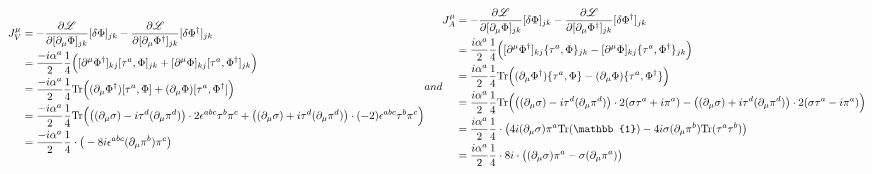 \begin{subequations}
    \begin{align}
        J^\mu_V & =-\frac{\partial\mathscr{L}}{\partial[\partial_\mu\Phi]_{jk}}[\delta\Phi]_{jk}-\frac{\partial\mathscr{L}}{\partial[\partial_\mu\Phi^\dagger]_{jk}}[\delta\Phi^\dagger]_{jk}                                                                      \\
                & =\frac{-\imagu\alpha^a}{2}\frac{1}{4}\Big([\partial^\mu\Phi^\dagger]_{kj}[\tau^a,\Phi]_{jk}+[\partial^\mu\Phi]_{kj}[\tau^a,\Phi^\dagger]_{jk}\Big)                                                                                               \\
                & =\frac{-\imagu\alpha^a}{2}\frac{1}{4}\Tr\Big((\partial_\mu\Phi^\dagger)[\tau^a,\Phi]+(\partial_\mu\Phi)[\tau^a,\Phi^\dagger]\Big)                                                                                                                \\
                & =\frac{-\imagu\alpha^a}{2}\frac{1}{4}\Tr\Big(\big((\partial_\mu\sigma)-\imagu\tau^d(\partial_\mu\pi^d)\big)\cdot2\epsilon^{abc}\tau^b\pi^c+\big((\partial_\mu\sigma)+\imagu\tau^d(\partial_\mu\pi^d)\big)\cdot(-2)\epsilon^{abc}\tau^b\pi^c\Big) \\
                & =\frac{-\imagu\alpha^a}{2}\frac{1}{4}\cdot\big(-8\imagu\epsilon^{abc}(\partial_\mu\pi^b)\pi^c\big)
    \end{align}
    and
    \begin{align}
        J^\mu_A & =-\frac{\partial\mathscr{L}}{\partial[\partial_\mu\Phi]_{jk}}[\delta\Phi]_{jk}-\frac{\partial\mathscr{L}}{\partial[\partial_\mu\Phi^\dagger]_{jk}}[\delta\Phi^\dagger]_{jk}                                                                    \\
                & =\frac{\imagu\alpha^a}{2}\frac{1}{4}\Big([\partial^\mu\Phi^\dagger]_{kj}\{\tau^a,\Phi\}_{jk}-[\partial^\mu\Phi]_{kj}\{\tau^a,\Phi^\dagger\}_{jk}\Big)                                                                                          \\
                & =\frac{\imagu\alpha^a}{2}\frac{1}{4}\Tr\Big((\partial_\mu\Phi^\dagger)\{\tau^a,\Phi\}-(\partial_\mu\Phi)\{\tau^a,\Phi^\dagger\}\Big)                                                                                                           \\
                & =\frac{\imagu\alpha^a}{2}\frac{1}{4}\Tr\Big(\big((\partial_\mu\sigma)-\imagu\tau^d(\partial_\mu\pi^d)\big)\cdot2(\sigma\tau^a+\imagu\pi^a)-\big((\partial_\mu\sigma)+\imagu\tau^d(\partial_\mu\pi^d)\big)\cdot2(\sigma\tau^a-\imagu\pi^a)\Big) \\
                & =\frac{\imagu\alpha^a}{2}\frac{1}{4}\cdot\big(4\imagu(\partial_\mu\sigma)\pi^a\Tr(\mathbb{1})-4\imagu\sigma(\partial_\mu\pi^b)\Tr(\tau^a\tau^b)\big)                                                                                           \\
                & =\frac{\imagu\alpha^a}{2}\frac{1}{4}\cdot8\imagu\cdot\big((\partial_\mu\sigma)\pi^a-\sigma(\partial_\mu\pi^a)\big)
    \end{align}
\end{subequations}

